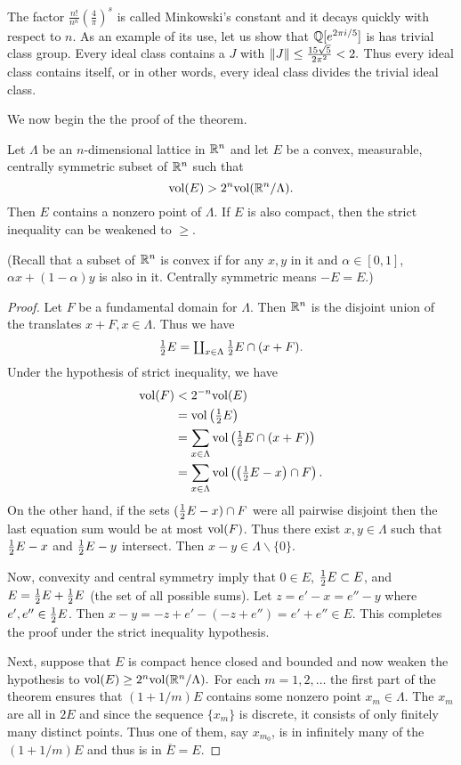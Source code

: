 \documentclass[10pt,a4paper,reqno]{amsart}
\begin{document}
\begin{ap}
The factor $\frac{n!}{n^n} \left( \frac{4}{\pi} \right)^s$ is called
Minkowski's constant and it decays quickly with respect to $n$. As an example
of its use, let us show that $\mathbb{Q}[e^{2\pi i/5}]$ is has trivial class group.
Every ideal class contains a $J$ with $\| J\| \le \frac{15\sqrt{5}}{2\pi^2} <
2.$ Thus every ideal class contains \OK{} itself, or in other words, every
ideal class divides the trivial ideal class.
\end{ap}

We now begin the the proof of the theorem.

\begin{lem}
Let $\Lambda$ be an $n$-dimensional lattice in $\mathbb{R}^n$ and let $E$ be a convex,
measurable, centrally symmetric subset of $\mathbb{R}^n$ such that \[\mathrm{vol}(E) > 2^n
\mathrm{vol}(\mathbb{R}^n/\Lambda).\] Then $E$ contains a nonzero point of $\Lambda$. If $E$ is
also compact, then the strict inequality can be weakened to $\ge$.

(Recall that a subset of $\mathbb{R}^n$ is convex if for any $x,y$ in it and $\alpha\in
[0,1]$, $\alpha x + (1-\alpha)y$ is also in it. Centrally symmetric means $-E
= E$.)
\end{lem}
\begin{proof}
Let $F$ be a fundamental domain for $\Lambda$. Then $\mathbb{R}^n$ is the disjoint
union of the translates $x+F, x\in \Lambda$. Thus we have \[\textstyle{\frac{1}{2}} E =
\coprod_{x\in \Lambda} \textstyle{\frac{1}{2}} E \cap (x+F).\] Under the hypothesis of strict
inequality, we have
\begin{align*}
    \mathrm{vol}(F) & < 2^{-n}\mathrm{vol}(E) \\
    &= \mathrm{vol}\left( \textstyle{\frac{1}{2}} E \right) \\
    &= \sum_{x\in \Lambda} \mathrm{vol}\left( {\textstyle{\frac{1}{2}} E \cap (x+F)} \right)\\
    &= \sum_{x\in \Lambda} \mathrm{vol}\left( {\left( \textstyle{\frac{1}{2}} E - x \right)
    \cap F} \right).
\end{align*} On the other hand, if the sets $ (\textstyle{\frac{1}{2}} E - x )\cap F $ were all
pairwise disjoint then the last equation sum would be at most $\mathrm{vol}(F)$. Thus
there exist $x,y\in\Lambda$ such that $\textstyle{\frac{1}{2}} E -x$ and $\textstyle{\frac{1}{2}} E -y$ intersect.
Then $x-y \in \Lambda\smallsetminus \{0\}.$

Now, convexity and central symmetry imply that $0\in E$, $\textstyle{\frac{1}{2}} E \subset E$,
and $E = \textstyle{\frac{1}{2}} E + \textstyle{\frac{1}{2}} E$ (the set of all possible sums). Let $z = e'-x = e''
-y $ where $e',e'' \in \textstyle{\frac{1}{2}} E$. Then $x-y = -z + e' - (-z + e'') = e'+e''\in
E$. This completes the proof under the strict inequality hypothesis.

Next, suppose that $E$ is compact hence closed and bounded and now weaken the
hypothesis to $\mathrm{vol}(E) \ge 2^n \mathrm{vol}(\mathbb{R}^n/\Lambda).$ For each $m=1,2,\dots$ the
first part of the theorem ensures that $(1+1/m)E$ contains some nonzero point
$x_m\in \Lambda$. The $x_m$ are all in $2E$ and since the sequence $\{x_m\}$ is
discrete, it consists of only finitely many distinct points. Thus one of them,
say $x_{m_0}$, is in infinitely many of the $(1+1/m)E$ and thus is in
$\overline{E} = E.$
\end{proof}
\end{document}
